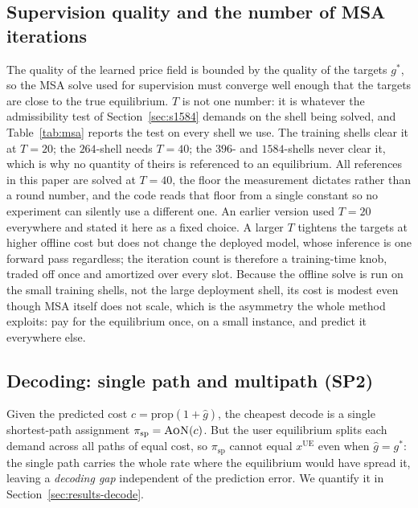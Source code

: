 \documentclass[journal]{IEEEtran}
\newcommand{\prop}{\mathrm{prop}}
\newcommand{\AoN}{\textsc{AoN}}
\begin{document}
\subsection{Supervision quality and the number of MSA iterations}\label{sec:supervision}
The quality of the learned price field is bounded by the quality of the targets $g^{*}$, so
the MSA solve used for supervision must converge well enough that the targets are close to the
true equilibrium. $T$ is not one number: it is whatever the admissibility test of
Section~\ref{sec:s1584} demands on the shell being solved, and Table~\ref{tab:msa} reports the
test on every shell we use. The training shells clear it at $T{=}20$; the $264$-shell needs
$T{=}40$; the $396$- and $1584$-shells never clear it, which is why no quantity of theirs is
referenced to an equilibrium. All references in this paper are solved at $T{=}40$, the floor the
measurement dictates rather than a round number, and the code reads that floor from a single
constant so no experiment can silently use a different one. An earlier version used $T{=}20$
everywhere and stated it here as a fixed choice. A larger $T$ tightens the
targets at higher offline cost but does not change the deployed model, whose inference is one
forward pass regardless; the iteration count is therefore a training-time knob, traded off once
and amortized over every slot. Because the offline solve is run on the small training shells,
not the large deployment shell, its cost is modest even though MSA itself does not scale, which
is the asymmetry the whole method exploits: pay for the equilibrium once, on a small instance,
and predict it everywhere else.

\subsection{Decoding: single path and multipath (SP2)}\label{sec:decode}
Given the predicted cost $c=\prop(1{+}\hat g)$, the cheapest decode is a single
shortest-path assignment $\pi_{\mathrm{sp}}=\AoN(c)$. But the user equilibrium splits
each demand across all paths of equal cost, so $\pi_{\mathrm{sp}}$ cannot equal
$x^{\mathrm{UE}}$ even when $\hat g=g^{*}$: the single path carries the whole rate where
the equilibrium would have spread it, leaving a \emph{decoding gap} independent of the
prediction error. We quantify it in Section~\ref{sec:results-decode}.
\end{document}

